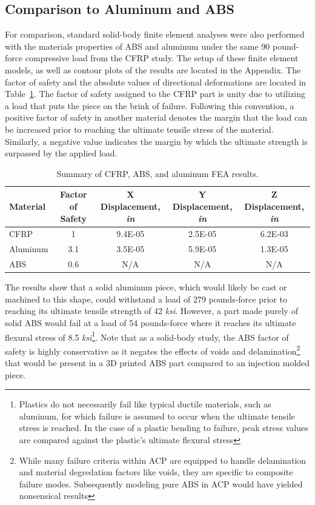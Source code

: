 \clearpage

\subsection{Comparison to Aluminum and ABS}

\indent

For comparison, standard solid-body finite element analyses were also performed with the materials properties of ABS and aluminum under the same 90 pound-force compressive load from the CFRP study. The setup of these finite element models, as well as contour plots of the results are located in the Appendix. The factor of safety and the absolute values of directional deformations are located in Table~\ref{tab:fea-cfrp-al-abs}. The factor of safety assigned to the CFRP part is unity due to utilizing a load that puts the piece on the brink of failure. Following this convention, a positive factor of safety in another material denotes the margin that the load can be increased prior to reaching the ultimate tensile stress of the material. Similarly, a negative value indicates the margin by which the ultimate strength is surpassed by the applied load.

\begin{table}[htp]
    \centering
    \begin{tabular}{lcccc}
    
        Material & Factor of Safety & X Displacement, \emph{in} & Y Displacement, \emph{in} & Z Displacement, \emph{in} \\ \hline
        CFRP & 1 & 9.4E-05 & 2.5E-05 & 6.2E-03 \\
        Aluminum & 3.1 & 3.5E-05 & 5.9E-05 & 1.3E-05 \\
        ABS & 0.6 & N/A & N/A & N/A \\
                
    \end{tabular}
    \caption{Summary of CFRP, ABS, and aluminum FEA results.}
    \label{tab:fea-cfrp-al-abs}
\end{table}

The results show that a solid aluminum piece, which would likely be cast or machined to this shape, could withstand a load of 279 pounds-force prior to reaching its ultimate tensile strength of 42 \emph{ksi}. However, a part made purely of solid ABS would fail at a load of 54 pounds-force where it reaches its ultimate flexural stress of 8.5 \emph{ksi}\footnote{Plastics do not necessarily fail like typical ductile materials, such as aluminum, for which failure is assumed to occur when the ultimate tensile stress is reached. In the case of a plastic bending to failure, peak stress values are compared against the plastic's ultimate flexural stress}. Note that as a solid-body study, the ABS factor of safety is highly conservative as it negates the effects of voids and delamination\footnote{While many failure criteria within ACP are equipped to handle delamination and material degredation factors like voids, they are specific to composite failure modes. Subsequently modeling pure ABS in ACP would have yielded nonsensical results} that would be present in a 3D printed ABS part compared to an injection molded piece.\\

